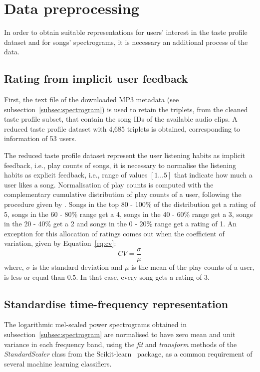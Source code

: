 \section{Data preprocessing}
In order to obtain suitable representations for users' interest in the taste profile dataset and for songs' spectrograms, it is necessary an additional process of the data.
\subsection{Rating from implicit user feedback}
\label{subsec:rating}
First, the text file of the downloaded MP3 metadata (see subsection~\ref{subsec:spectrogram}) is used to retain the triplets, from the cleaned taste profile subset, that contain the song IDs of the available audio clips. A reduced taste profile dataset with 4,685 triplets is obtained, corresponding to information of 53 users.

The reduced taste profile dataset represent the user listening habits as implicit feedback, i.e., play counts of songs, it is necessary to normalise the listening habits as explicit feedback, i.e., range of values $[1\ldots5]$ that indicate how much a user likes a song. Normalisation of play counts is computed with the complementary cumulative distribution of play counts of a user, following the procedure given by \textcite{1242}. Songs in the top 80 - 100\% of the distribution get a rating of 5, songs in the 60 - 80\% range get a 4, songs in the 40 - 60\% range get a 3, songs in the 20 - 40\% get a 2 and songs in the 0 - 20\% range get a rating of 1. An exception for this allocation of ratings comes out when the coefficient of variation, given by Equation~\eqref{eq:cv}:
\begin{equation}
CV=\frac{\sigma}{\mu}
\label{eq:cv}
\end{equation}
where, $\sigma$ is the standard deviation and $\mu$ is the mean of the play counts of a user, is less or equal than $0.5$. In that case, every song gets a rating of 3.

\subsection{Standardise time-frequency representation}
\label{subsec:normalised}
The logarithmic mel-scaled power spectrograms obtained in subsection~\ref{subsec:spectrogram} are normalised to have zero mean and unit variance in each frequency band, using the \textit{fit} and \textit{transform} methods of the \textit{StandardScaler} class from the Scikit-learn~\parencite{scikit-learn} package, as a common requirement of several machine learning classifiers.

